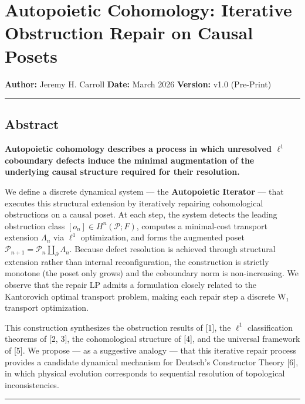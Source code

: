 \documentclass[
]{article}
\author{}
\date{}
\begin{document}
\section{Autopoietic Cohomology: Iterative Obstruction Repair on Causal
Posets}\label{autopoietic-cohomology-iterative-obstruction-repair-on-causal-posets}

\textbf{Author:} Jeremy H. Carroll \textbf{Date:} March 2026
\textbf{Version:} v1.0 (Pre-Print)

\begin{center}\rule{0.5\linewidth}{0.5pt}\end{center}

\subsection{Abstract}\label{abstract}

\textbf{Autopoietic cohomology describes a process in which unresolved
\(\ell^1\) coboundary defects induce the minimal augmentation of the
underlying causal structure required for their resolution.}

We define a discrete dynamical system --- the \textbf{Autopoietic
Iterator} --- that executes this structural extension by iteratively
repairing cohomological obstructions on a causal poset. At each step,
the system detects the leading obstruction class
\([o_n] \in H^n(\mathcal{P}; F)\), computes a minimal-cost transport
extension \(\Lambda_n\) via \(\ell^1\) optimization, and forms the
augmented poset
\(\mathcal{P}_{n+1} = \mathcal{P}_n \coprod_{\partial} \Lambda_n\).
Because defect resolution is achieved through structural extension
rather than internal reconfiguration, the construction is strictly
monotone (the poset only grows) and the coboundary norm is
non-increasing. We observe that the repair LP admits a formulation
closely related to the Kantorovich optimal transport problem, making
each repair step a discrete W₁ transport optimization.

This construction synthesizes the obstruction results of {[}1{]}, the
\(\ell^1\) classification theorems of {[}2, 3{]}, the cohomological
structure of {[}4{]}, and the universal framework of {[}5{]}. We propose
--- as a suggestive analogy --- that this iterative repair process
provides a candidate dynamical mechanism for Deutsch's Constructor
Theory {[}6{]}, in which physical evolution corresponds to sequential
resolution of topological inconsistencies.

\begin{center}\rule{0.5\linewidth}{0.5pt}\end{center}
\end{document}
